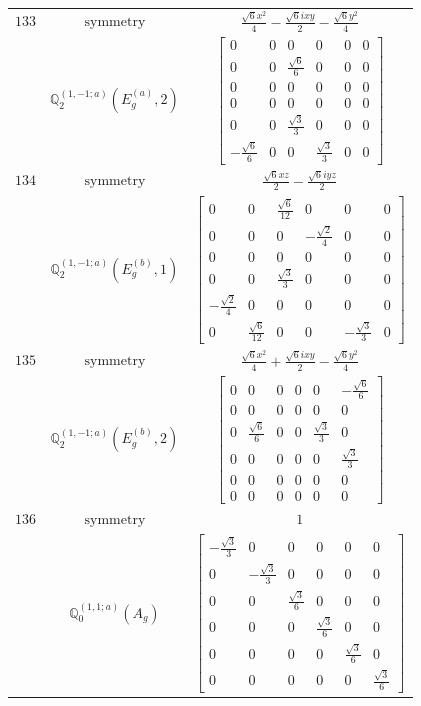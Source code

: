 \documentclass[fleqn,8pt,landscape]{jsarticle}
\begin{document}
\begin{longtable}{ccc}
$ 133 $ & $ \text{symmetry} $ & $ \frac{\sqrt{6} x^{2}}{4} - \frac{\sqrt{6} i x y}{2} - \frac{\sqrt{6} y^{2}}{4} $ \\
$  $ & $ \mathbb{Q}_{2}^{(1,-1;a)}(E_{g}^{(a)},2) $ & $ \begin{bmatrix} 0 & 0 & 0 & 0 & 0 & 0 \\ 0 & 0 & \frac{\sqrt{6}}{6} & 0 & 0 & 0 \\ 0 & 0 & 0 & 0 & 0 & 0 \\ 0 & 0 & 0 & 0 & 0 & 0 \\ 0 & 0 & \frac{\sqrt{3}}{3} & 0 & 0 & 0 \\ - \frac{\sqrt{6}}{6} & 0 & 0 & \frac{\sqrt{3}}{3} & 0 & 0 \end{bmatrix} $ \\ \hline
$ 134 $ & $ \text{symmetry} $ & $ \frac{\sqrt{6} x z}{2} - \frac{\sqrt{6} i y z}{2} $ \\
$  $ & $ \mathbb{Q}_{2}^{(1,-1;a)}(E_{g}^{(b)},1) $ & $ \begin{bmatrix} 0 & 0 & \frac{\sqrt{6}}{12} & 0 & 0 & 0 \\ 0 & 0 & 0 & - \frac{\sqrt{2}}{4} & 0 & 0 \\ 0 & 0 & 0 & 0 & 0 & 0 \\ 0 & 0 & \frac{\sqrt{3}}{3} & 0 & 0 & 0 \\ - \frac{\sqrt{2}}{4} & 0 & 0 & 0 & 0 & 0 \\ 0 & \frac{\sqrt{6}}{12} & 0 & 0 & - \frac{\sqrt{3}}{3} & 0 \end{bmatrix} $ \\ \hline
$ 135 $ & $ \text{symmetry} $ & $ \frac{\sqrt{6} x^{2}}{4} + \frac{\sqrt{6} i x y}{2} - \frac{\sqrt{6} y^{2}}{4} $ \\
$  $ & $ \mathbb{Q}_{2}^{(1,-1;a)}(E_{g}^{(b)},2) $ & $ \begin{bmatrix} 0 & 0 & 0 & 0 & 0 & - \frac{\sqrt{6}}{6} \\ 0 & 0 & 0 & 0 & 0 & 0 \\ 0 & \frac{\sqrt{6}}{6} & 0 & 0 & \frac{\sqrt{3}}{3} & 0 \\ 0 & 0 & 0 & 0 & 0 & \frac{\sqrt{3}}{3} \\ 0 & 0 & 0 & 0 & 0 & 0 \\ 0 & 0 & 0 & 0 & 0 & 0 \end{bmatrix} $ \\ \hline
$ 136 $ & $ \text{symmetry} $ & $ 1 $ \\
$  $ & $ \mathbb{Q}_{0}^{(1,1;a)}(A_{g}) $ & $ \begin{bmatrix} - \frac{\sqrt{3}}{3} & 0 & 0 & 0 & 0 & 0 \\ 0 & - \frac{\sqrt{3}}{3} & 0 & 0 & 0 & 0 \\ 0 & 0 & \frac{\sqrt{3}}{6} & 0 & 0 & 0 \\ 0 & 0 & 0 & \frac{\sqrt{3}}{6} & 0 & 0 \\ 0 & 0 & 0 & 0 & \frac{\sqrt{3}}{6} & 0 \\ 0 & 0 & 0 & 0 & 0 & \frac{\sqrt{3}}{6} \end{bmatrix} $ \\ \hline

\end{longtable}
\end{document}
